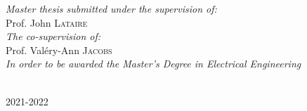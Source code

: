 \documentclass[a4paper,12pt]{article}
\numberwithin{equation}{section}
\begin{document}
\begin{titlepage}
\begin{minipage}{1\textwidth}
\begin{flushright} \large
\emph{Master	thesis	submitted	under	the	supervision	of:} \\
Prof. John \textsc{Lataire} \\
\vspace{1cm}
\emph{The	co-supervision	of:} \\
Prof. Valéry-Ann\textsc{ Jacobs} \\
\vspace{1cm}
\emph{In	order	to	be	awarded the	
Master’s	Degree	in Electrical Engineering	} \\
\end{flushright}
\end{minipage}\\[2cm]




\vfill
{\large 2021-2022}\\[2cm] %

\end{titlepage}

\newpage
\end{document}
